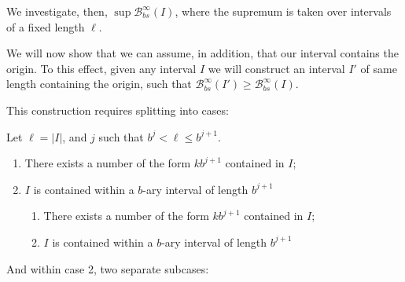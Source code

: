 \documentclass[11pt, reqno]{amsart}
\newcommand{\BB}{\mathcal{B}}
\begin{document}
We investigate, then, $\sup \BB_{bs}^\infty(I)$, where the supremum is taken over intervals of a fixed length $\ell$.

We will now show that we can assume, in addition, that our interval contains the origin. To this effect, given any interval $I$ we will construct an interval $I'$ of same length containing the origin, such that $\BB_{bs}^\infty(I') \geq \BB_{bs}^\infty(I)$.

This construction requires splitting into cases:

Let $\ell = \lvert I \rvert$, and $j$ such that $b^j < \ell \leq b^{j+1}$.

\begin{enumerate}[label=\textbf{Case \arabic*: }]
\item There exists a number of the form $k b^{j+1}$ contained in $I$;

\item $I$ is contained within a $b$-ary interval of length $b^{j+1}$

\begin{enumerate}[label=\textbf{Subcase \alph*: }]
\item There exists a number of the form $k b^{j+1}$ contained in $I$;

\item $I$ is contained within a $b$-ary interval of length $b^{j+1}$
\end{enumerate}
\end{enumerate}

And within case 2, two separate subcases:
\end{document}
